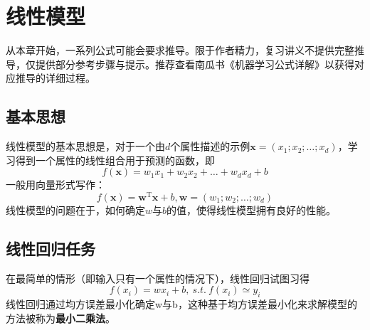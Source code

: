 \chapter{线性模型}
\begin{importantbox}
从本章开始，一系列公式可能会要求推导。限于作者精力，复习讲义不提供完整推导，仅提供部分参考步骤与提示。推荐查看南瓜书《机器学习公式详解》以获得对应推导的详细过程。
\end{importantbox}
\section{基本思想}\label{sec:2.1}
线性模型的基本思想是，对于一个由$d$个属性描述的示例$\boldsymbol{x}=\left(x_{1} ; x_{2} ; \ldots ; x_{d}\right)$，学习得到一个属性的线性组合用于预测的函数，即
\[
f(\boldsymbol{x})=w_{1} x_{1}+w_{2} x_{2}+\ldots+w_{d} x_{d}+b
\]
一般用向量形式写作：
\[
f(\boldsymbol{x})=\boldsymbol{w}^{\mathrm{T}} \boldsymbol{x}+b, 
\boldsymbol{w}=\left(w_{1} ; w_{2} ; \ldots ; w_{d}\right)
\]
线性模型的问题在于，如何确定$w$与$b$的值，使得线性模型拥有良好的性能。

\section{线性回归任务}\label{sec:3.2}
在最简单的情形（即输入只有一个属性的情况下），线性回归试图习得\[
f(x_i)=wx_i+b,\ s.t. \ f(x_i) \simeq y_i
\]
线性回归通过均方误差最小化确定w与b，这种基于均方误差最小化来求解模型的方法被称为\textbf{最小二乘法}。


